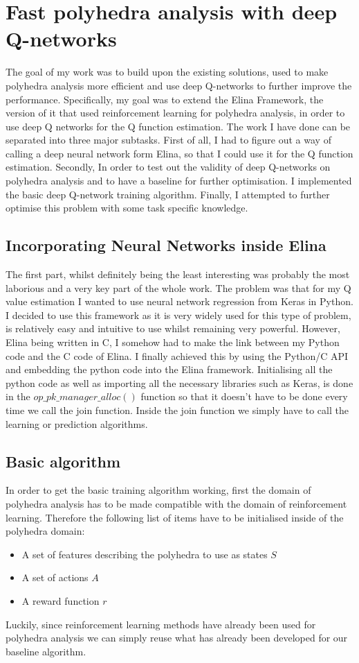 
\chapter{Fast polyhedra analysis with deep Q-networks}

The goal of my work was to build upon the existing solutions, used to make polyhedra analysis more efficient and use deep Q-networks to further improve the performance. Specifically, my goal was to extend the Elina Framework, the version of it that used reinforcement learning for polyhedra analysis, in order to use deep Q networks for the Q function estimation. The work I have done can be separated into three major subtasks. First of all, I had to figure out a way of calling a deep neural network form Elina, so that I could use it for the Q function estimation. Secondly, In order to test out the validity of deep Q-networks on polyhedra analysis and to have a baseline for further optimisation. I implemented the basic deep Q-network training algorithm. Finally, I attempted to further optimise this problem with some task specific knowledge.
\section{Incorporating Neural Networks inside Elina}
The first part, whilst definitely being the least interesting was probably the most laborious and a very key part of the whole work. The problem was that for my Q value estimation I wanted to use neural network regression from Keras in Python. I decided to use this framework as it is very widely used for this type of problem, is relatively easy and intuitive to use whilst remaining very powerful. However, Elina being written in C, I somehow had to make the link between my Python code and the C code of Elina. I finally achieved this by using the Python/C API and embedding the python code into the Elina framework. Initialising all the python code as well as importing all the necessary libraries such as Keras, is done in the $op\_pk\_manager\_alloc()$ function so that it doesn't have to be done every time we call the join function. Inside the join function we simply have to call the learning or prediction algorithms.
\section{Basic algorithm}
In order to get the basic training algorithm working, first the domain of polyhedra analysis has to be made compatible with the domain of reinforcement learning. Therefore the following list of items have to be initialised inside of the polyhedra domain:
\begin{itemize}
	\item A set of features describing the polyhedra to use as states $S$
	\item A set of actions $A$
	\item A reward function $r$
\end{itemize}
Luckily, since reinforcement learning methods have already been used for polyhedra analysis we can simply reuse what has already been developed for our baseline algorithm.\\
